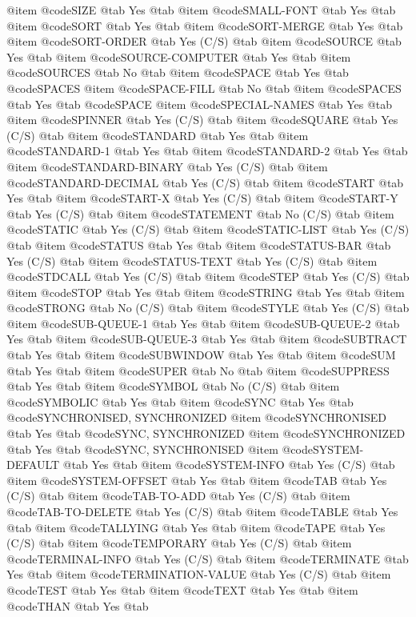 @item @code{SIZE} @tab Yes @tab 
@item @code{SMALL-FONT} @tab Yes @tab 
@item @code{SORT} @tab Yes @tab 
@item @code{SORT-MERGE} @tab Yes @tab 
@item @code{SORT-ORDER} @tab Yes	(C/S) @tab 
@item @code{SOURCE} @tab Yes @tab 
@item @code{SOURCE-COMPUTER} @tab Yes @tab 
@item @code{SOURCES} @tab No @tab 
@item @code{SPACE} @tab Yes @tab @code{SPACES}
@item @code{SPACE-FILL} @tab No @tab 
@item @code{SPACES} @tab Yes @tab @code{SPACE}
@item @code{SPECIAL-NAMES} @tab Yes @tab 
@item @code{SPINNER} @tab Yes	(C/S) @tab 
@item @code{SQUARE} @tab Yes	(C/S) @tab 
@item @code{STANDARD} @tab Yes @tab 
@item @code{STANDARD-1} @tab Yes @tab 
@item @code{STANDARD-2} @tab Yes @tab 
@item @code{STANDARD-BINARY} @tab Yes	(C/S) @tab 
@item @code{STANDARD-DECIMAL} @tab Yes	(C/S) @tab 
@item @code{START} @tab Yes @tab 
@item @code{START-X} @tab Yes	(C/S) @tab 
@item @code{START-Y} @tab Yes	(C/S) @tab 
@item @code{STATEMENT} @tab No	(C/S) @tab 
@item @code{STATIC} @tab Yes	(C/S) @tab 
@item @code{STATIC-LIST} @tab Yes	(C/S) @tab 
@item @code{STATUS} @tab Yes @tab 
@item @code{STATUS-BAR} @tab Yes	(C/S) @tab 
@item @code{STATUS-TEXT} @tab Yes	(C/S) @tab 
@item @code{STDCALL} @tab Yes	(C/S) @tab 
@item @code{STEP} @tab Yes	(C/S) @tab 
@item @code{STOP} @tab Yes @tab 
@item @code{STRING} @tab Yes @tab 
@item @code{STRONG} @tab No	(C/S) @tab 
@item @code{STYLE} @tab Yes	(C/S) @tab 
@item @code{SUB-QUEUE-1} @tab Yes @tab 
@item @code{SUB-QUEUE-2} @tab Yes @tab 
@item @code{SUB-QUEUE-3} @tab Yes @tab 
@item @code{SUBTRACT} @tab Yes @tab 
@item @code{SUBWINDOW} @tab Yes @tab 
@item @code{SUM} @tab Yes @tab 
@item @code{SUPER} @tab No @tab 
@item @code{SUPPRESS} @tab Yes @tab 
@item @code{SYMBOL} @tab No	(C/S) @tab 
@item @code{SYMBOLIC} @tab Yes @tab 
@item @code{SYNC} @tab Yes @tab @code{SYNCHRONISED, SYNCHRONIZED}
@item @code{SYNCHRONISED} @tab Yes @tab @code{SYNC, SYNCHRONIZED}
@item @code{SYNCHRONIZED} @tab Yes @tab @code{SYNC, SYNCHRONISED}
@item @code{SYSTEM-DEFAULT} @tab Yes @tab 
@item @code{SYSTEM-INFO} @tab Yes	(C/S) @tab 
@item @code{SYSTEM-OFFSET} @tab Yes @tab 
@item @code{TAB} @tab Yes	(C/S) @tab 
@item @code{TAB-TO-ADD} @tab Yes	(C/S) @tab 
@item @code{TAB-TO-DELETE} @tab Yes	(C/S) @tab 
@item @code{TABLE} @tab Yes @tab 
@item @code{TALLYING} @tab Yes @tab 
@item @code{TAPE} @tab Yes	(C/S) @tab 
@item @code{TEMPORARY} @tab Yes	(C/S) @tab 
@item @code{TERMINAL-INFO} @tab Yes	(C/S) @tab 
@item @code{TERMINATE} @tab Yes @tab 
@item @code{TERMINATION-VALUE} @tab Yes	(C/S) @tab 
@item @code{TEST} @tab Yes @tab 
@item @code{TEXT} @tab Yes @tab 
@item @code{THAN} @tab Yes @tab 
